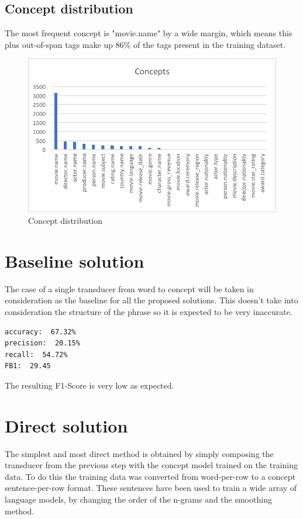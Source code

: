 \documentclass[11pt,a4paper]{article}
\begin{document}
\subsection{Concept distribution}

The most frequent concept is "movie.name" by a wide margin, which means this plus out-of-span tags make up 86\% of the tags present in the training dataset.

\begin{figure}[h]
\centering
  \includegraphics[width=.9\linewidth]{Images/concepts}
  \caption{Concept distribution}
\label{fig:zipf}
\end{figure}

\section{Baseline solution}
The case of a single transducer from word to concept will be taken in consideration as the baseline for all the proposed solutions.
This doesn't take into consideration the structure of the phrase so it is expected to be very inaccurate. 

\begin{verbatim}
accuracy:  67.32%
precision:  20.15%
recall:  54.72%
FB1:  29.45
\end{verbatim}

The resulting F1-Score is very low as expected.

\section{Direct solution}

The simplest and most direct method is obtained by simply composing the transducer from the previous step with the concept model trained on the training data.
To do this the training data was converted from word-per-row to a concept sentence-per-row format. These sentences have been used to train a wide array of language models, by changing the order of the n-grams and the smoothing method.
\end{document}
